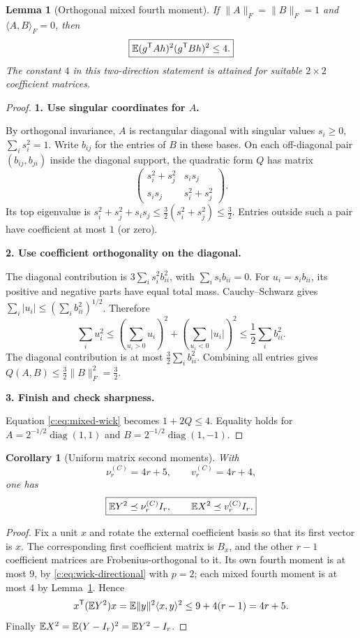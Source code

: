\documentclass[11pt]{article}
\numberwithin{equation}{section}
\newtheorem{lemma}[theorem]{Lemma}
\newtheorem{corollary}[theorem]{Corollary}
\theoremstyle{definition}\newtheorem{definition}[theorem]{Definition}
\theoremstyle{remark}\newtheorem{remark}[theorem]{Remark}
\newcommand{\norm}[1]{\lVert#1\rVert}\newcommand{\ip}[2]{\langle#1,#2\rangle}
\newcommand{\step}[1]{\par\addvspace{.65\baselineskip}\Needspace{4\baselineskip}\noindent\textbf{#1}\par\nobreak\smallskip}
\DeclareMathOperator{\diag}{diag}
\begin{document}
\begin{lemma}[Orthogonal mixed fourth moment]\label{c:lem:wick-mixed}
If $\norm A_F=\norm B_F=1$ and $\langle A,B\rangle_F=0$, then
\begin{equation}\label{c:eq:wick-mixed4}
 \boxed{\mathbb E(g^{\mathsf T}Ah)^2(g^{\mathsf T}Bh)^2\le4.}
\end{equation}
The constant $4$ in this two-direction statement is attained for suitable
$2\times2$ coefficient matrices.
\end{lemma}
\begin{proof}
\step{1. Use singular coordinates for $A$.}
By orthogonal invariance, $A$ is rectangular diagonal with singular values $s_i\ge0$, $\sum_i s_i^2=1$. Write $b_{ij}$ for the entries of $B$ in these bases. On each off-diagonal pair $(b_{ij},b_{ji})$ inside the diagonal support, the quadratic form $Q$ has matrix
\[
 \begin{pmatrix}s_i^2+s_j^2&s_is_j\\s_is_j&s_i^2+s_j^2\end{pmatrix}.
\]
Its top eigenvalue is $s_i^2+s_j^2+s_is_j\le\tfrac32(s_i^2+s_j^2)\le\tfrac32$. Entries outside such a pair have coefficient at most $1$ (or zero).

\step{2. Use coefficient orthogonality on the diagonal.}
The diagonal contribution is $3\sum_i s_i^2b_{ii}^2$, with $\sum_i s_i b_{ii}=0$. For $u_i=s_i b_{ii}$, its positive and negative parts have equal total mass. Cauchy--Schwarz gives $\sum_i|u_i|\le(\sum_i b_{ii}^2)^{1/2}$. Therefore
\[
 \sum_i u_i^2\le
 \left(\sum_{u_i>0}u_i\right)^2+
 \left(\sum_{u_i<0}|u_i|\right)^2
 \le\frac12\sum_i b_{ii}^2.
\]
The diagonal contribution is at most $\tfrac32\sum_i b_{ii}^2$. Combining all entries gives $Q(A,B)\le\tfrac32\norm B_F^2=\tfrac32$.

\step{3. Finish and check sharpness.}
Equation \eqref{c:eq:mixed-wick} becomes $1+2Q\le4$. Equality holds for
$A=2^{-1/2}\diag(1,1)$ and $B=2^{-1/2}\diag(1,-1)$.
\end{proof}

\begin{corollary}[Uniform matrix second moments]\label{c:cor:wick-variance}
With
\begin{equation}\label{c:eq:variance-parameters}
 \nu_r^{(C)}=4r+5,\qquad v_r^{(C)}=4r+4,
\end{equation}
one has
\begin{equation}\label{c:eq:variance}
 \boxed{\mathbb E Y^2\preceq\nu_r^{(C)} I_r,\qquad \mathbb E X^2\preceq v_r^{(C)} I_r.}
\end{equation}
\end{corollary}
\begin{proof}
Fix a unit $x$ and rotate the external coefficient basis so that its first vector is $x$. The corresponding first coefficient matrix is $B_x$, and the other $r-1$ coefficient matrices are Frobenius-orthogonal to it. Its own fourth moment is at most $9$, by \eqref{c:eq:wick-directional} with $p=2$; each mixed fourth moment is at most $4$ by Lemma~\ref{c:lem:wick-mixed}. Hence
\[
 x^{\mathsf T}(\E Y^2)x=\E\norm y^2\ip{x}{y}^2\le9+4(r-1)=4r+5.
\]
Finally $\mathbb E X^2=\mathbb E(Y-I_r)^2=\mathbb E Y^2-I_r$.
\end{proof}
\end{document}
